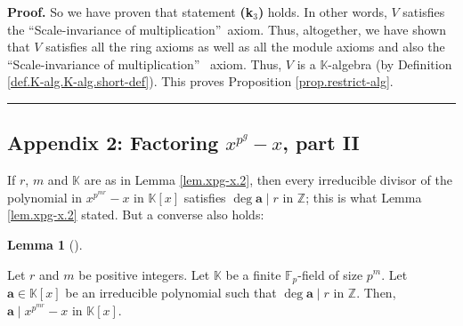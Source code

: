 \documentclass[numbers=enddot,12pt,final,onecolumn,notitlepage]{scrartcl}%
\theoremstyle{definition}
\newtheorem{lem}[theo]{Lemma}
\newenvironment{lemma}[1][]
{\begin{lem}[#1]\begin{leftbar}}
{\end{leftbar}\end{lem}}
\newenvironment{fineprint}{\begin{small}}{\end{small}}
\newenvironment{proof}[1][Proof]{\noindent\textbf{#1.} }{\ \rule{0.5em}{0.5em}}
\begin{document}
\begin{fineprint}
\begin{proof}
So we have proven that statement \textbf{(k}$_{3}$\textbf{)} holds. In other
words, $V$ satisfies the \textquotedblleft Scale-invariance of
multiplication\textquotedblright\ axiom. Thus, altogether, we have shown that
$V$ satisfies all the ring axioms as well as all the module axioms and also
the \textquotedblleft Scale-invariance of multiplication\textquotedblright%
\ axiom. Thus, $V$ is a $\mathbb{K}$-algebra (by Definition
\ref{def.K-alg.K-alg.short-def}). This proves Proposition
\ref{prop.restrict-alg}.
\end{proof}
\end{fineprint}

\subsection{Appendix 2: Factoring $x^{p^{g}}-x$, part II}

If $r$, $m$ and $\mathbb{K}$ are as in Lemma \ref{lem.xpg-x.2}, then every
irreducible divisor of the polynomial in $x^{p^{mr}}-x$ in $\mathbb{K}\left[
x\right]  $ satisfies $\deg\mathbf{a}\mid r$ in $\mathbb{Z}$; this is what
Lemma \ref{lem.xpg-x.2} stated. But a converse also holds:

\begin{lemma}
\label{lem.xpg-x.4}Let $r$ and $m$ be positive integers. Let $\mathbb{K}$ be a
finite $\mathbb{F}_{p}$-field of size $p^{m}$. Let $\mathbf{a}\in
\mathbb{K}\left[  x\right]  $ be an irreducible polynomial such that
$\deg\mathbf{a}\mid r$ in $\mathbb{Z}$. Then, $\mathbf{a}\mid x^{p^{mr}}-x$ in
$\mathbb{K}\left[  x\right]  $.
\end{lemma}
\end{document}
